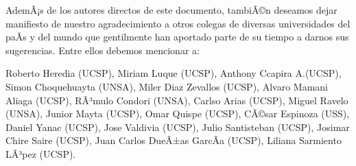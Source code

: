 AdemÃ¡s de los autores directos de este documento, tambiÃ©n deseamos dejar manifiesto de nuestro 
agradecimiento a otros colegas de diversas universidades del paÃ­s y del mundo que gentilmente 
han aportado parte de su tiempo a darnos sus sugerencias. Entre ellos debemos mencionar a: 

Roberto Heredia (UCSP), 
Miriam Luque (UCSP), 
Anthony Ccapira A.(UCSP), 
Simon Choquehuayta (UNSA), 
Miler Diaz Zevallos (UCSP), 
Alvaro Mamani Aliaga (UCSP), 
RÃ³mulo Condori (UNSA), 
Carlso Arias (UCSP), 
Miguel Ravelo (UNSA), 
Junior Mayta (UCSP), 
Omar Quispe (UCSP), 
CÃ©sar Espinoza (USS), 
Daniel Yanac (UCSP), 
Jose Valdivia (UCSP), 
Julio Santisteban (UCSP), 
Josimar Chire Saire (UCSP), 
Juan Carlos DueÃ±as GarcÃ­a (UCSP), 
Liliana Sarmiento LÃ³pez (UCSP).